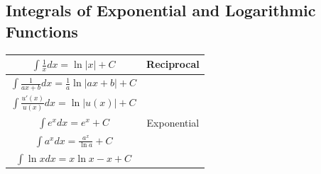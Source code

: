 \documentclass{article}
\begin{document}
        \subsection{Integrals of Exponential and Logarithmic Functions}
            \begin{center}
                \begin{tabular} {|c|c|}
                    \hline
                    $\int \frac{1}{x} dx = \ln{|x|}+C$ & Reciprocal \\
                    \hline
                    $\int \frac{1}{ax+b}dx = \frac{1}{a}\ln{|ax+b|}+C$ & \\
                    \hline
                    $\int \frac{u'(x)}{u(x)}dx = \ln{|u(x)|+C}$ & \\
                    \hline
                    $\int e^x dx = e^x+C$ & Exponential \\
                    \hline
                    $\int a^x dx = \frac{a^x}{\ln{a}}+C$ & \\
                    \hline
                    $\int \ln{x} dx = x\ln{x}-x + C$ & \\
                    \hline
                \end{tabular}
            \end{center}

        \pagebreak
\end{document}
